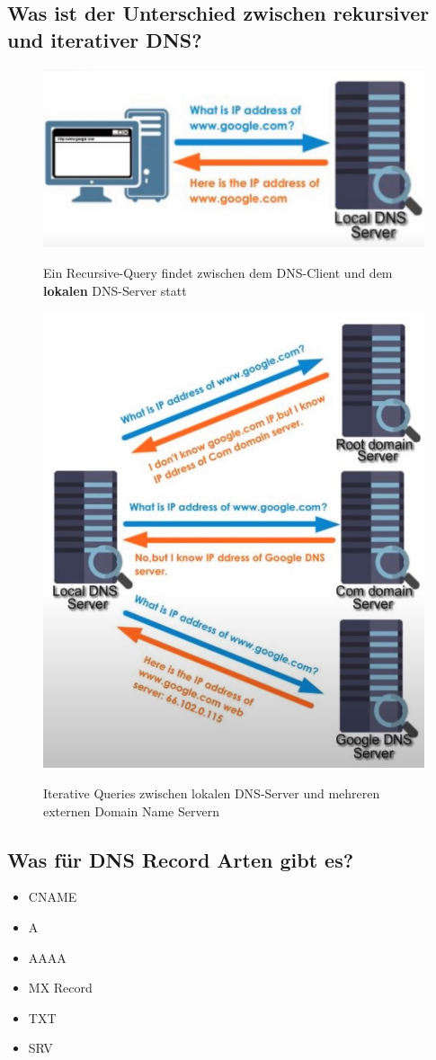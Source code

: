 \subsection*{Was ist der Unterschied zwischen rekursiver und iterativer DNS?}
\begin{multicols*}{2}
    \begin{figure}[H]
        \begin{center}
            \label{pic:DNSRecursive}
    \includegraphics[width=.5\textwidth]{images/dns_recursive_query.jpg}
    \caption[DNS Recursive Query]{Ein Recursive-Query findet zwischen dem DNS-Client und dem \textbf{lokalen} DNS-Server statt\footnotemark[4]}
    \end{center}
\end{figure}
\columnbreak
\begin{figure}[H]
    \begin{center}
        \label{pic:DNSIterative}
        \includegraphics[width=.33\textwidth]{images/dns_iterative_query.jpg}
        \caption[DNS Iterative Query]{Iterative Queries zwischen lokalen DNS-Server und mehreren externen Domain Name Servern\footnotemark[4]}
    \end{center}
\end{figure}
\end{multicols*}

\subsection*{Was für DNS Record Arten gibt es?}
\begin{itemize}
        \item CNAME
        \item A
        \item AAAA
        \item MX Record
        \item TXT
        \item SRV
\end{itemize}

